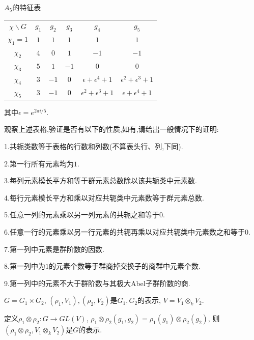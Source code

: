 \begin{example} $A_5$的特征表
    \begin{center}
    \begin{tabular}{c|c|c|c|c|c} 
    $\chi \backslash G$ & $g_1$ & $g_2$ & $g_3$ & $g_4$ & $g_5$\\
    $\chi_1=1$ & $1$ & $1$ &  $1$ & $1$ & $1$\\
    $\chi_2$ & $4$ & $0$ &  $1$ & $-1$ & $-1$\\
    $\chi_3$ & $5$ & $1$ &  $-1$ & $0$ & $0$\\
    $\chi_4$ & $3$ & $-1$ & $0$ & $\epsilon+\epsilon^4+1$ & $\epsilon^2+\epsilon^3+1$\\
    $\chi_5$ & $3$ & $-1$ & $0$ & $\epsilon^2+\epsilon^3+1$ & $\epsilon+\epsilon^4+1$
    \end{tabular}
    \end{center}
    其中$\epsilon=e^{2\pi i/5}$.
\end{example}

\begin{exercise}
    观察上述表格,验证是否有以下的性质,如有,请给出一般情况下的证明:

    \qquad 1.共轭类数等于表格的行数和列数(不算表头行、列,下同).

    \qquad 2.第一行所有元素均为$1$.

    \qquad 3.每列元素模长平方和等于群元素总数除以该共轭类中元素数.

    \qquad 4.每行元素模长平方和乘以对应共轭类中元素数等于群元素总数.

    \qquad 5.任意一列的元素乘以另一列元素的共轭之和等于$0$.

    \qquad 6.任意一行的元素乘以另一行元素的共轭再乘以对应共轭类中元素数之和等于$0$.

    \qquad 7.第一列中元素是群阶数的因数.

    \qquad 8.第一列中为$1$的元素个数等于群商掉交换子的商群中元素个数.

    \qquad 9.第一列中的元素不大于群阶数与其极大Abel子群阶数的商.
\end{exercise}

\begin{definition}
    $G=G_1\times G_2$, $(\rho_1,V_1), (\rho_2,V_2)$是$G_1,G_2$的表示, 
    $V=V_1\otimes_k V_2$.\par
    \qquad 定义$\rho_1\otimes \rho_2: G\rightarrow GL(V)$, 
    $\rho_1\otimes \rho_2(g_1,g_2)=\rho_1(g_1)\otimes \rho_2(g_2)$, 
    则$(\rho_1\otimes \rho_2,V_1\otimes_k V_2)$是$G$的表示.
\end{definition}

